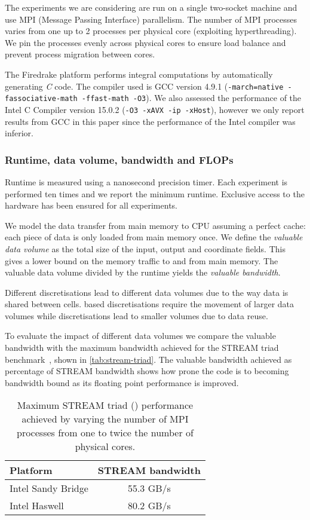 \documentclass[11pt, a4paper]{scrartcl}
\begin{document}
The experiments we are considering are run on a single two-socket
machine and use MPI (Message Passing Interface) parallelism. The
number of MPI processes varies from one up to 2 processes per physical
core (exploiting hyperthreading). We pin the processes evenly across
physical cores to ensure load balance and prevent process migration
between cores.

The Firedrake platform performs integral computations by automatically
generating \emph{C} code. The compiler used is GCC version 4.9.1
(\texttt{-march=native -fassociative-math -ffast-math -O3}).  We also
assessed the performance of the Intel C Compiler version 15.0.2
(\texttt{-O3 -xAVX -ip -xHost}), however we only report results from
GCC in this paper since the performance of the Intel compiler was
inferior.

\subsubsection{Runtime, data volume, bandwidth and FLOPs}
\label{sssec:runtime}
Runtime is measured using a nanosecond precision timer. Each
experiment is performed ten times and we report the minimum
runtime. Exclusive access to the hardware has been ensured for all
experiments.

We model the data transfer from main memory to CPU assuming a perfect
cache: each piece of data is only loaded from main memory once. We
define the \emph{valuable data volume} as the total size of the input,
output and coordinate fields. This gives a lower bound on the memory
traffic to and from main memory. The valuable data volume divided by
the runtime yields the \emph{valuable bandwidth}.

Different discretisations lead to different data volumes due to the
way data is shared between cells.  based discretisations
require the movement of larger data volumes while 
discretisations lead to smaller volumes due to data reuse.

To evaluate the impact of different data volumes we compare the
valuable bandwidth with the maximum bandwidth achieved for the STREAM
triad benchmark~\citep{McCalpin:1995}, shown in
\autoref{tab:stream-triad}.  The valuable bandwidth achieved as
percentage of STREAM bandwidth shows how prone the code is to becoming
bandwidth bound as its floating point performance is improved.
\begin{table}[htbp]
  \centering
  \begin{tabular}{l|c}
    Platform           & STREAM bandwidth \\
    \hline
    Intel Sandy Bridge & 55.3 GB/s        \\
    Intel Haswell      & 80.2 GB/s        \\
  \end{tabular}
  \caption{Maximum STREAM triad () performance
    achieved by varying the number of MPI processes from one to twice
    the number of physical cores.\label{tab:stream-triad}}
\end{table}
\end{document}
